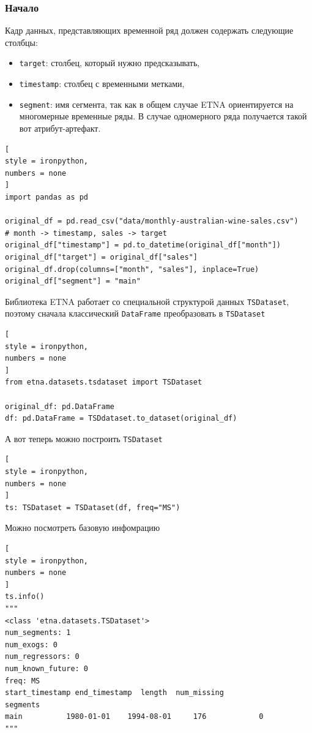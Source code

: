 \documentclass[%
	11pt,
	a4paper,
	utf8,
		]{article}
\begin{document}
\subsubsection{Начало}

Кадр данных, представляющих временной ряд должен содержать следующие столбцы:
\begin{itemize}
	\item \verb|target|: столбец, который нужно предсказывать,
	
	\item \verb|timestamp|: столбец с временными метками,
	
	\item \verb|segment|: имя сегмента, так как в общем случае ETNA ориентируется на многомерные временные ряды. В случае одномерного ряда получается такой вот атрибут-артефакт.
\end{itemize}

\begin{lstlisting}[
style = ironpython,
numbers = none	
]
import pandas as pd

original_df = pd.read_csv("data/monthly-australian-wine-sales.csv")
# month -> timestamp, sales -> target
original_df["timestamp"] = pd.to_datetime(original_df["month"])
original_df["target"] = original_df["sales"]
original_df.drop(columns=["month", "sales"], inplace=True)
original_df["segment"] = "main"
\end{lstlisting}

Библиотека ETNA работает со специальной структурой данных \verb|TSDataset|, поэтому сначала классический \verb|DataFrame| преобразовать в \verb|TSDataset|
\begin{lstlisting}[
style = ironpython,
numbers = none
]
from etna.datasets.tsdataset import TSDataset

original_df: pd.DataFrame
df: pd.DataFrame = TSDdataset.to_dataset(original_df)
\end{lstlisting}

А вот теперь можно построить \verb|TSDataset|
\begin{lstlisting}[
style = ironpython,
numbers = none
]
ts: TSDataset = TSDataset(df, freq="MS")
\end{lstlisting}

Можно посмотреть базовую инфомрацию
\begin{lstlisting}[
style = ironpython,
numbers = none
]
ts.info()
"""
<class 'etna.datasets.TSDataset'>
num_segments: 1
num_exogs: 0
num_regressors: 0
num_known_future: 0
freq: MS
start_timestamp end_timestamp  length  num_missing
segments                                                   
main          1980-01-01    1994-08-01     176            0
"""
\end{lstlisting}
\end{document}
